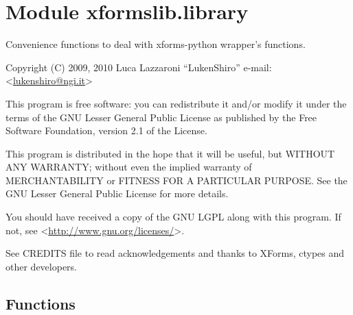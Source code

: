 %
%
%


\section{Module xformslib.library}

    \label{xformslib:library}

Convenience functions to deal with xforms-python wrapper's functions.

Copyright (C) 2009, 2010  Luca Lazzaroni ``LukenShiro''
e-mail: <\href{mailto:lukenshiro@ngi.it}{lukenshiro@ngi.it}>

This program is free software: you can redistribute it and/or modify
it under the terms of the GNU Lesser General Public License as
published by the Free Software Foundation, version 2.1 of the License.

This program is distributed in the hope that it will be useful,
but WITHOUT ANY WARRANTY; without even the implied warranty of
MERCHANTABILITY or FITNESS FOR A PARTICULAR PURPOSE. See the
GNU Lesser General Public License for more details.

You should have received a copy of the GNU LGPL along with this
program. If not, see <\href{http://www.gnu.org/licenses/}{http://www.gnu.org/licenses/}>.

See CREDITS file to read acknowledgements and thanks to XForms,
ctypes and other developers.


  \subsection{Functions}

    \label{xformslib:library:get_xforms_version}

